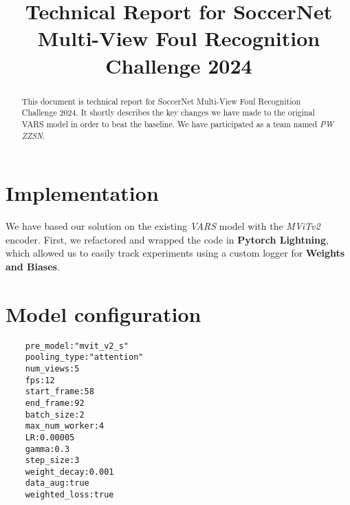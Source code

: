 \documentclass[conference]{IEEEtran}
\begin{document}
\title{Technical Report for SoccerNet Multi-View Foul Recognition Challenge 2024\\}

\author{
    \and
}

\maketitle

\begin{abstract}
    This document is technical report for SoccerNet Multi-View Foul Recognition Challenge 2024. It shortly describes the key changes we have made to the original VARS model in order to beat the baseline. We have participated as a team named \textit{PW ZZSN}.
\end{abstract}


\section{Implementation}
We have based our solution on the existing \textit{VARS} model with the \textit{MViTv2} encoder. First, we refactored and wrapped the code in \textbf{Pytorch Lightning}, which allowed us to easily track experiments using a custom logger for \textbf{Weights and Biases}.

\section{Model configuration}

\begin{verbatim}
    pre_model:"mvit_v2_s"
    pooling_type:"attention"
    num_views:5
    fps:12
    start_frame:58
    end_frame:92
    batch_size:2
    max_num_worker:4
    LR:0.00005
    gamma:0.3
    step_size:3
    weight_decay:0.001
    data_aug:true
    weighted_loss:true
\end{verbatim}
\end{document}
